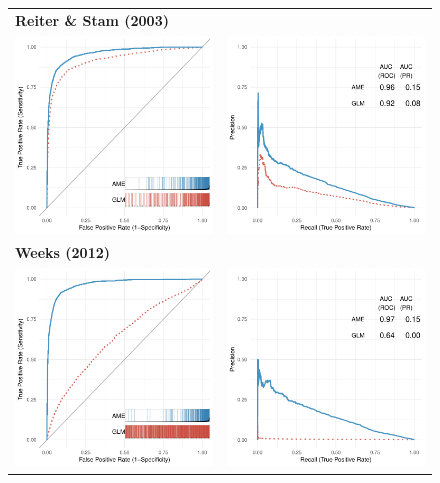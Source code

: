 \begin{figure}
	\centering   
	\begin{tabular}{cc}
		\multicolumn{2}{l}{\textbf{Reiter \& Stam (2003)}} \\
		\includegraphics[width=.4\textwidth]{reiter_stam_roc_outSample.pdf} & 
		\includegraphics[width=.4\textwidth]{reiter_stam_pr_outSample.pdf} \\
		\multicolumn{2}{l}{\textbf{Weeks (2012)}} \\
		\includegraphics[width=.4\textwidth]{weeks_roc_outSample.pdf} & 
		\includegraphics[width=.4\textwidth]{weeks_pr_outSample.pdf} \\

\end{tabular}
\end{figure}
